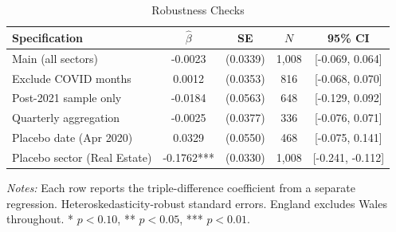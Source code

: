 \begin{table}[H]
\centering
\caption{Robustness Checks}
\label{tab:robust}
\begin{threeparttable}
\begin{tabular}{lcccc}
\toprule
Specification & $\hat{\beta}$ & SE & $N$ & 95\% CI \\
\midrule
Main (all sectors) & -0.0023 & (0.0339) & 1,008 & [-0.069, 0.064] \\
Exclude COVID months & 0.0012 & (0.0353) & 816 & [-0.068, 0.070] \\
Post-2021 sample only & -0.0184 & (0.0563) & 648 & [-0.129, 0.092] \\
Quarterly aggregation & -0.0025 & (0.0377) & 336 & [-0.076, 0.071] \\
Placebo date (Apr 2020) & 0.0329 & (0.0550) & 468 & [-0.075, 0.141] \\
Placebo sector (Real Estate) & -0.1762*** & (0.0330) & 1,008 & [-0.241, -0.112] \\
\bottomrule
\end{tabular}
\begin{tablenotes}[flushleft]
\small
\item \textit{Notes:} Each row reports the triple-difference coefficient from a separate regression. Heteroskedasticity-robust standard errors. England excludes Wales throughout. * $p<0.10$, ** $p<0.05$, *** $p<0.01$.
\end{tablenotes}
\end{threeparttable}
\end{table}
